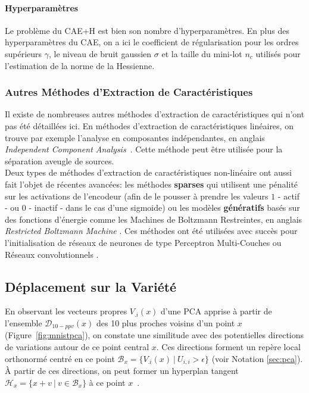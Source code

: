 \paragraph{Hyperparamètres} Le problème du CAE+H est bien son nombre
d'hyperparamètres. En plus des hyperparamètres du CAE, on a ici le coefficient
de régularisation pour les ordres supérieurs $\gamma$, le niveau de bruit
gaussien $\sigma$ et la taille du mini-lot $n_c$ utilisés pour l'estimation de
la norme de la Hessienne.

\subsubsection{Autres Méthodes d'Extraction de Caractéristiques}

Il existe de nombreuses autres méthodes d'extraction de caractéristiques qui
n'ont pas été détaillées ici. En méthodes d'extraction de caractéristiques
linéaires, on trouve par exemple l'analyse en composantes indépendantes, en
anglais \textit{Independent Component Analysis}~\citep{Comon94,Hyvarinen-2001}.
Cette méthode peut être utilisée pour la séparation aveugle de sources.  \\

Deux types de méthodes d'extraction de caractéristiques non-linéaire  ont aussi
fait l'objet de récentes avancées: les méthodes {\bf sparses}
\citep{ranzato-08,koray-psd-08,Koray-08} qui utilisent une pénalité sur les
activations de l'encodeur (afin de le pousser à prendre les valeurs $1$ - actif
- ou $0$ - inactif - dans le cas d'une sigmoide)  ou les modèles {\bf
génératifs} basés sur des fonctions d'énergie \citep{ranzato-unsup-07} comme les
Machines de Boltzmann Restreintes, en anglais \textit{Restricted Boltzmann
Machine} \citep{Tieleman08}.  Ces méthodes ont été utilisées avec succès pour
l'initialisation de réseaux de neurones de type Perceptron Multi-Couches
\citep{HintonG2006,ranzato-08,koray-psd-08,Koray-08} ou Réseaux convolutionnels
\citep{koray-nips-10-small}. 

\subsection{Déplacement sur la Variété}
\label{sec:surfing}

En observant les vecteurs propres $V_{.i}(x)$ d'une PCA apprise à partir de
l'ensemble $\mathcal{D}_{10-ppv}(x)$ des 10 plus proches voisins d'un point $x$
(Figure~\ref{fig:mnistpca}), on constate une similitude avec des potentielles
directions de variations autour de ce point central $x$.  Ces directions
forment un repère local orthonormé centré en ce point $\mathcal{B}_{x}=\lbrace
V_{.i}(x)~|~U_{i,i} > \epsilon\rbrace$ (voir Notation \ref{sec:pca}). À partir
de ces directions, on peut former un hyperplan tangent $\mathcal{H}_{x}=\lbrace
x + v~|~v\in\mathcal{B}_{x} \rbrace$ à ce point $x$~\citep{Dauphin-et-al-NIPS2011}.

